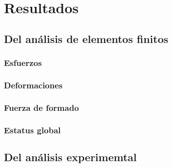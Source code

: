 \chapter{Resultados}

\section{Del análisis de elementos finitos}

\subsection{Esfuerzos}

\subsection{Deformaciones}

\subsection{Fuerza de formado}

\subsection{Estatus global}


\section{Del análisis experimemtal}



\subsection{}

